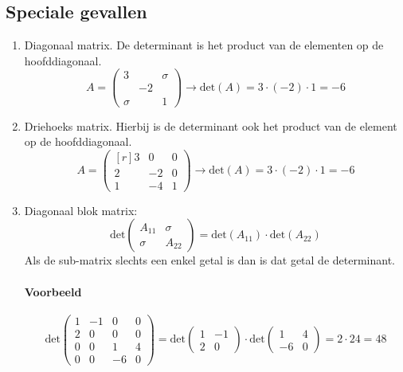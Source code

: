 \subsection{Speciale gevallen}
\begin{enumerate}
	\item Diagonaal matrix. De determinant is het product van de elementen op de hoofddiagonaal.
	\[ A = \begin{pmatrix}
		3 && \sigma \\
		& -2 & \\
		\sigma && 1
	\end{pmatrix} \to \mbox{det}(A) = 3 \cdot (-2) \cdot 1 = -6 \]
	
	\item Driehoeks matrix. Hierbij is de determinant ook het product van de element op de hoofddiagonaal.
	\[A = \begin{pmatrix*}[r]
		3 & 0 & 0 \\
		2 & -2 & 0 \\
		1 & -4 & 1
	\end{pmatrix*} \to \mbox{det}(A) = 3 \cdot (-2) \cdot 1 = -6 \]
	
	\item Diagonaal blok matrix: \[\mbox{det} \begin{pmatrix}
		A_{11} & \sigma \\
		\sigma & A_{22}
	\end{pmatrix} = \mbox{det}(A_{11}) \cdot \mbox{det}(A_{22}) \]
	Als de sub-matrix slechts een enkel getal is dan is dat getal de determinant.
	
	\paragraph{Voorbeeld}
	\[
		\mbox{det} \left(\!\begin{array}{rr|rr}
			1 & -1 & 0 & 0 \\
			2 & 0 & 0 & 0 \\ \hline
			0 & 0 & 1 & 4 \\
			0 & 0 & -6 & 0
		\end{array}\!\right)
		= \mbox{det}\begin{pmatrix*} 1 & -1 \\ 2 & 0 \end{pmatrix*} \cdot \mbox{det} \begin{pmatrix*} 1 & 4 \\ -6 & 0 \end{pmatrix*}
		= 2 \cdot 24 = 48 \]
\end{enumerate}

